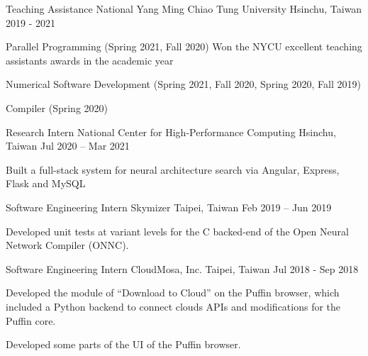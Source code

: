 

\begin{cventries}

  \cventry
    {Teaching Assistance} %
    {National Yang Ming Chiao Tung University} %
    {Hsinchu, Taiwan} %
    {2019 - 2021} %
    {
      \begin{cvitems} %
        \item {Parallel Programming (Spring 2021, Fall 2020) Won the NYCU excellent teaching assistants awards in the academic year}
        \item {Numerical Software Development (Spring 2021, Fall 2020, Spring 2020, Fall 2019)}
        \item {Compiler (Spring 2020)}
      \end{cvitems}
    }

  \cventry
    {Research Intern} %
    {National Center for High-Performance Computing} %
    {Hsinchu, Taiwan} %
    {Jul 2020 – Mar 2021} %
    {
      \begin{cvitems} %
        \item {Built a full-stack system for neural architecture search via Angular, Express, Flask and MySQL}
      \end{cvitems}
    }

  \cventry
    {Software Engineering Intern} %
    {Skymizer} %
    {Taipei, Taiwan} %
    {Feb 2019 – Jun 2019} %
    {
      \begin{cvitems} %
        \item {Developed unit tests at variant levels for the C backed-end of the Open Neural Network Compiler (ONNC).}
      \end{cvitems}
    }

  \cventry
    {Software Engineering Intern} %
    {CloudMosa, Inc.} %
    {Taipei, Taiwan} %
    {Jul 2018 - Sep 2018} %
    {
      \begin{cvitems} %
        \item {Developed the module of ``Download to Cloud'' on the Puffin browser, which included a Python backend to connect clouds APIs and modifications for the Puffin core.}
        \item {Developed some parts of the UI of the Puffin browser.}
      \end{cvitems}
    }


\end{cventries}
